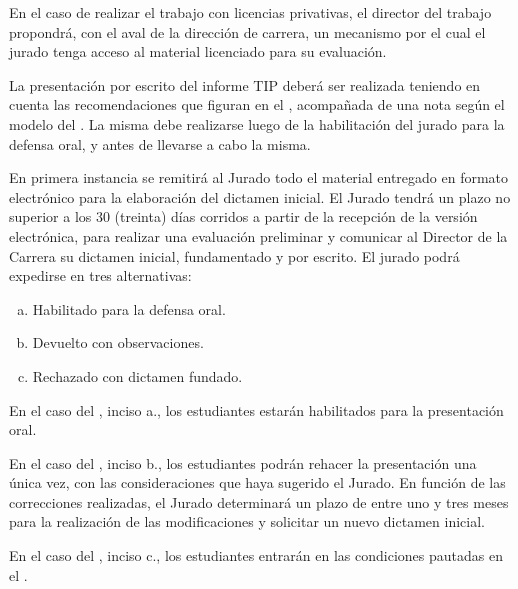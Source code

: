 \articulo En el caso de realizar el trabajo con licencias privativas, el director del trabajo 
propondrá, con el aval de la dirección de carrera,
un mecanismo por el cual el jurado tenga acceso al material licenciado para su
evaluación. 

\articulo La presentación por escrito del informe TIP deberá ser realizada
teniendo en cuenta las recomendaciones que figuran en el \anexoPresentacionInforme, acompañada de una nota
según el modelo del \anexoPresentacionInformeEscrito. La misma debe realizarse
luego de la habilitación del jurado para la defensa oral, y antes de llevarse a
cabo la misma.

\articulo En primera instancia se remitirá al Jurado todo el material entregado
en formato electrónico para la elaboración del dictamen inicial. El Jurado tendrá un
plazo no superior a los 30 (treinta) días corridos a partir de la recepción de la versión
electrónica, para realizar una evaluación preliminar y comunicar al Director de la
Carrera su dictamen inicial, fundamentado y por escrito. El jurado podrá expedirse en
tres alternativas:

\begin{enumerate}[a.]
\item Habilitado para la defensa oral.
\item Devuelto con observaciones.
\item Rechazado con dictamen fundado.
\end{enumerate}


\articulo En el caso del \artDictamenInicial, inciso a., los estudiantes
estarán habilitados para la presentación oral. 

\articulo En el caso del \artDictamenInicial, inciso b., los estudiantes podrán rehacer
la presentación una única vez, con las consideraciones que haya sugerido el Jurado.
En función de las correcciones realizadas, el Jurado determinará un plazo de entre
uno y tres meses para la realización de las modificaciones y solicitar un nuevo
dictamen inicial.

\articulo En el caso del \artDictamenInicial, inciso c., los estudiantes entrarán en las
condiciones pautadas en el \artFinalizado. 

